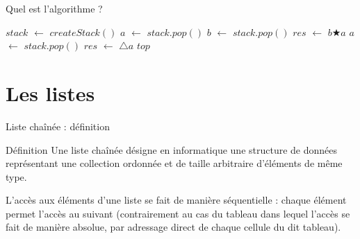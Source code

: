 \documentclass[10pt,xcolor=dvipsnames]{beamer}
\newcommand*\Let[2]{\State #1 $\gets$ #2}
\newcommand{\defin}[1]{\textcolor{darkspringgreen}{#1}}
\begin{document}
\begin{frame}{Quel est l'algorithme ?}
        \begin{tcolorbox}
  \begin{algorithmic}[1]
      \Let{$stack$}{$createStack()$}
            \Let{$a$}{$stack.pop()$}
            \Let{$b$}{$stack.pop()$}
            \Let{$res$}{$b \bigstar a$}
          \EndIf
            \Let{$a$}{$stack.pop()$}
            \Let{$res$}{$\triangle a$}
          \Else
            \State {}
          \EndIf
      \EndFor
      \State{} $top$
    \EndFunction
  \end{algorithmic}
\end{tcolorbox}
\end{frame}

\section{Les listes}

\begin{frame}{Liste chaînée : définition}
    
    \begin{exampleblock}{Définition}
        Une \defin{liste chaînée} désigne en informatique une structure de données représentant une collection ordonnée et de taille arbitraire d'éléments de même type.
    \end{exampleblock}
    
    L'accès aux éléments d'une liste se fait de manière séquentielle : chaque élément permet l'accès au suivant (contrairement au cas du tableau dans lequel l'accès se fait de manière absolue, par adressage direct de chaque cellule du dit tableau).
\end{frame}
\end{document}
